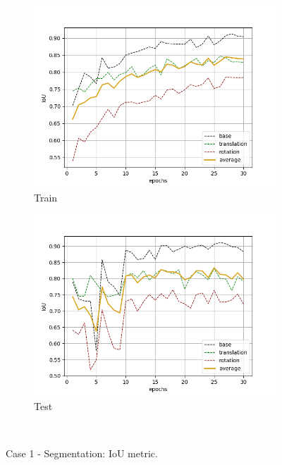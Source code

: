 \begin{figure}[H]
    \begin{subfigure}{.48\linewidth}
    \centering
    \includegraphics[scale=0.45]{Img/seg_nonoise_train_iou.png}
    \caption{Train}
    \end{subfigure}
    \begin{subfigure}{.48\linewidth}
    \centering
    \includegraphics[scale=0.45]{Img/seg_nonoise_test_iou.png}
    \caption{Test}
    \end{subfigure}\\
    \caption{Case 1 - Segmentation: IoU metric.}
\end{figure}
